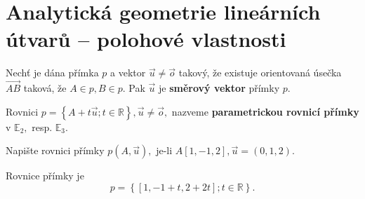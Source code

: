 \section{Analytická geometrie lineárních útvarů -- polohové vlastnosti}
\begin{definition}
    Nechť je dána přímka $p$ a vektor $\vec u\ne \vec o$
    takový, že existuje orientovaná úsečka $\overrightarrow{AB}$ taková, že
     $A\in p, B\in p.$ Pak $\vec u$
    je \textbf{směrový vektor} přímky $p.$
\end{definition}

\begin{definition}
    Rovnici $p = \left \{ A+t\vec u; t\in \mathbb R \right \},  \vec u \ne \vec o,$ nazveme
    \textbf{parametrickou rovnicí přímky} v $\mathbb E_2,$ resp. $\mathbb E_3.$
\end{definition}

\begin{priklad}
Napište rovnici přímky $p(A,\vec u),$ je-li $A[1,-1,2], \vec u = (0,1,2).$
\end{priklad}

\begin{reseni}
	Rovnice přímky je
	$$
	    p = \left \{ [1,-1 + t,2+ 2t]; t \in \mathbb R \right \}  .
	$$
\end{reseni}

